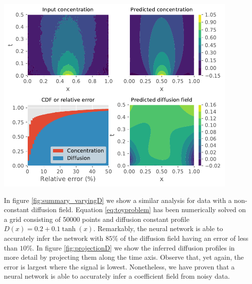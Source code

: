 \documentclass{Dissertate}
\let\origfigure\figure
\let\endorigfigure\endfigure
\renewenvironment{figure}[1][2] {
    \expandafter\origfigure\expandafter[H]
} {
    \endorigfigure
}
\begin{document}
\begin{figure}
\hypertarget{fig:summary_constantD}{%
\centering
\includegraphics[width=0.9\textwidth]{source/figures/pdf/summary_constantD_varyingPINN.pdf}
\caption{We show the training data and predicted concentration profile
in the upper left and right panels. The lower right panel shows the
inferred diffusion field while the lower left panel shows the CDF of the
relative error of the diffusion and
concentration.}\label{fig:summary_constantD}
}
\end{figure}

In figure \ref{fig:summary_varyingD} we show a similar analysis for
data with a non-constant diffusion field. Equation
\ref{eq:toyproblem} has been numerically solved on a grid consisting
of 50000 points and diffusion constant profile
\(D(x) = 0.2 + 0.1\tanh(x)\). Remarkably, the neural network is able to
accurately infer the network with \(85\%\) of the diffusion field having
an error of less than \(10\%\). In figure \ref{fig:projectionD} we
show the inferred diffusion profiles in more detail by projecting them
along the time axis. Observe that, yet again, the error is largest where
the signal is lowest. Nonetheless, we have proven that a neural network is
able to accurately infer a coefficient field from noisy data.
\end{document}
